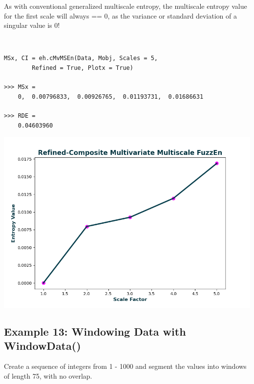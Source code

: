 \documentclass[12pt, a4paper, titlepage, openany]{book}
\begin{document}
\begin{tcolorbox}[colback=ehone!5, colframe=ehtwo!, title=\hypertarget{bidinote}{\textbf{NOTE}}, label={BiBox}]
As with conventional generalized multiscale entropy, the multiscale entropy value for the first scale will always == 0, as the variance or standard deviation of a singular value is 0!
\end{tcolorbox} \

\begin{verbatim}
MSx, CI = eh.cMvMSEn(Data, Mobj, Scales = 5, 
		Refined = True, Plotx = True)

>>> MSx =
    0,  0.00796833,  0.00926765,  0.01193731,  0.01686631

>>> RDE =
    0.04603960
\end{verbatim}
\includegraphics[scale=.7]{rcMvMSEn.png}




\newpage
\subsection{\normalsize Example 13: \hspace{15mm} Windowing Data with WindowData()}
\noindent Create a sequence of integers from 1 - 1000 and segment the values into windows of length 75, with no overlap.
\end{document}
